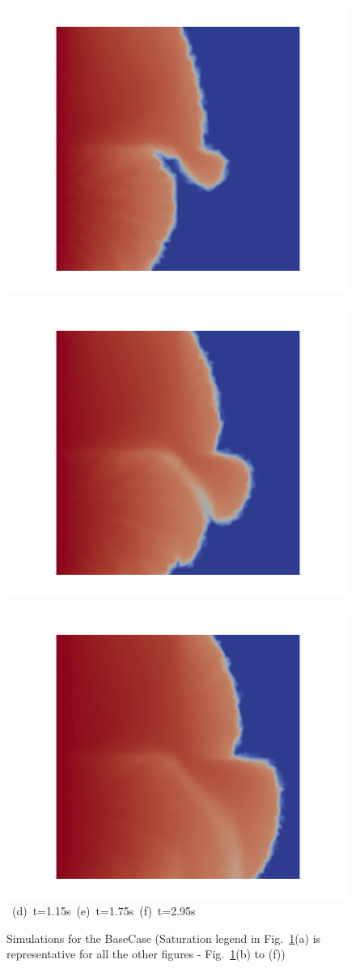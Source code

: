 \begin{landscape}
\begin{figure}[ht]
{\vspace{0.5cm}
\hbox{
      \includegraphics[width=.56\textwidth]{./Pics/BaseCase/BaseCase_Saturation_t_1dot15.png}
      \includegraphics[width=.56\textwidth]{./Pics/BaseCase/BaseCase_Saturation_t_1dot75.png} 
      \includegraphics[width=.56\textwidth]{./Pics/BaseCase/BaseCase_Saturation_t_2dot95.png}}
\vspace{0.cm}
\hbox{ \hspace{2.5cm} (d) t=1.15s \hspace{5.5cm} (e) t=1.75s   \hspace{5.5cm} (f) t=2.95s}
\vspace{0.cm}
}   
\caption{Simulations for the BaseCase (Saturation legend in Fig.~\ref{fig:BaseCase_Saturation}(a) is representative for all the other figures - \ie Fig.~\ref{fig:BaseCase_Saturation}(b) to (f))}
\label{fig:BaseCase_Saturation}
\end{figure}
\end{landscape}
\clearpage


